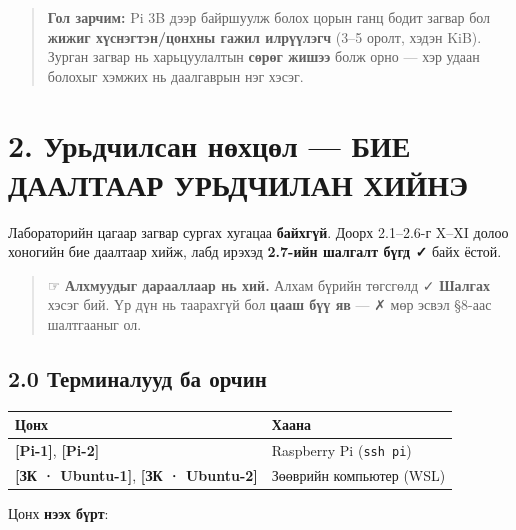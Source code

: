 \begin{quote}
\textbf{Гол зарчим:} Pi 3B дээр байршуулж болох цорын ганц бодит загвар бол \textbf{жижиг хүснэгтэн/цонхны гажил илрүүлэгч} (3--5 оролт, хэдэн KiB). Зурган загвар нь харьцуулалтын \textbf{сөрөг жишээ} болж орно --- хэр удаан болохыг хэмжих нь даалгаврын нэг хэсэг.
\end{quote}

\hypertarget{ux443ux440ux44cux434ux447ux438ux43bux441ux430ux43d-ux43dux4e9ux445ux446ux4e9ux43b-ux431ux438ux435-ux434ux430ux430ux43bux442ux430ux430ux440-ux443ux440ux44cux434ux447ux438ux43bux430ux43d-ux445ux438ux439ux43dux44d}{%
\section{2. Урьдчилсан нөхцөл --- БИЕ ДААЛТААР УРЬДЧИЛАН ХИЙНЭ}\label{ux443ux440ux44cux434ux447ux438ux43bux441ux430ux43d-ux43dux4e9ux445ux446ux4e9ux43b-ux431ux438ux435-ux434ux430ux430ux43bux442ux430ux430ux440-ux443ux440ux44cux434ux447ux438ux43bux430ux43d-ux445ux438ux439ux43dux44d}}

Лабораторийн цагаар загвар сургах хугацаа \textbf{байхгүй}. Доорх 2.1--2.6-г X--XI долоо хоногийн бие даалтаар хийж, лабд ирэхэд \textbf{2.7-ийн шалгалт бүгд ✓} байх ёстой.

\begin{quote}
☞ \textbf{Алхмуудыг дарааллаар нь хий.} Алхам бүрийн төгсгөлд ✓ \textbf{Шалгах} хэсэг бий. Үр дүн нь таарахгүй бол \textbf{цааш бүү яв} --- ✗ мөр эсвэл §8-аас шалтгааныг ол.
\end{quote}

\hypertarget{ux442ux435ux440ux43cux438ux43dux430ux43bux443ux443ux434-ux431ux430-ux43eux440ux447ux438ux43d}{%
\subsection{2.0 Терминалууд ба орчин}\label{ux442ux435ux440ux43cux438ux43dux430ux43bux443ux443ux434-ux431ux430-ux43eux440ux447ux438ux43d}}

\begingroup\scriptsize\begin{longtable}[]{@{}ll@{}}
\toprule
Цонх & Хаана\tabularnewline
\midrule
\endhead
\textbf{{[}Pi-1{]}}, \textbf{{[}Pi-2{]}} & Raspberry Pi (\texttt{ssh\ pi})\tabularnewline
\textbf{{[}ЗК · Ubuntu-1{]}}, \textbf{{[}ЗК · Ubuntu-2{]}} & Зөөврийн компьютер (WSL)\tabularnewline
\bottomrule
\end{longtable}\endgroup

Цонх \textbf{нээх бүрт}:


